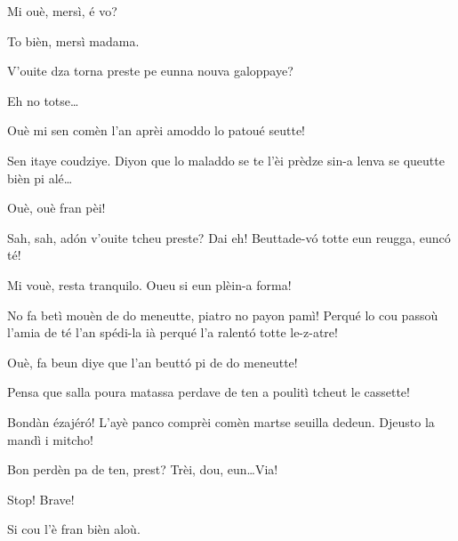 \begin{drama}
\Gerominespeaks Mi ouè, mersì, é vo?

\FennepulisieBspeaks To bièn, mersì madama.

\Gerominespeaks V'ouite dza torna preste pe eunna nouva galoppaye?

\FennepulisieBspeaks Eh no totse\ldots

\Casimirspeaks Ouè mi sen comèn l’an aprèi amoddo lo patoué seutte!

\FennepulisieCspeaks Sen itaye coudziye. Diyon que lo maladdo se te l’èi prèdze sin-a lenva se queutte bièn pi alé\ldots

\Casimirspeaks Ouè, ouè fran pèi!


\Starterspeaks Sah, sah, ad\'on v'ouite tcheu preste? Dai eh! Beuttade-v\'o totte eun reugga, eunc\'o té!

\FennepulisieAspeaks Mi vouè, resta tranquilo. Oueu si eun plèin-a forma!

\Starterspeaks No fa betì mouèn de do meneutte, piatro no payon pamì! Perqué lo cou passoù  l'amia de té l’an spédi-la ià perqué l’a ralent\'o totte le-z-atre!

\FennepulisieBspeaks Ouè, fa beun diye que l’an beutt\'o pi de do meneutte!

\FennepulisieCspeaks Pensa que salla poura matassa perdave de ten a poulitì tcheut le cassette!

\FennepulisieAspeaks Bondàn ézajér\'o! L’ayè panco comprèi comèn martse seuilla dedeun. Djeusto la mandì i mitcho!

\Starterspeaks Bon perdèn pa de ten, prest? Trèi, dou, eun\ldots Via!




\Starterspeaks Stop! Brave!

\FennepulisieBspeaks Si cou l’è fran bièn aloù.


\end{drama}
